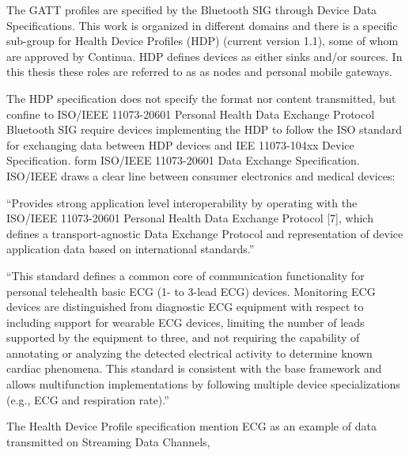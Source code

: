 The GATT profiles are specified by the Bluetooth SIG through Device Data Specifications. This work is organized in different domains and there is a specific sub-group for Health Device Profiles (HDP) (current version 1.1), some of whom are approved by Continua. HDP defines devices as either sinks and/or sources. In this thesis these roles are referred to as as nodes and personal mobile gateways.

The HDP specification does not specify the format nor content transmitted, but confine to ISO/IEEE 11073-20601 Personal Health Data Exchange Protocol \cite{newRef_18} Bluetooth SIG require devices implementing the HDP to follow the ISO standard for exchanging data between HDP devices and IEE 11073-104xx Device Specification. form ISO/IEEE 11073-20601 Data Exchange Specification. ISO/IEEE draws a clear line between consumer electronics and medical devices: 

``Provides strong application level interoperability by operating with the ISO/IEEE 11073-20601 Personal Health Data Exchange Protocol [7], which defines a transport-agnostic Data Exchange Protocol and representation of device application data based on international standards.''

``This standard defines a common core of communication functionality for personal telehealth basic ECG (1- to 3-lead ECG) devices. Monitoring ECG devices are distinguished from diagnostic ECG equipment with respect to including support for wearable ECG devices, limiting the number of leads supported by the equipment to three, and not requiring the capability of annotating or analyzing the detected electrical activity to determine known cardiac phenomena. This standard is consistent with the base framework and allows multifunction implementations by following multiple device specializations (e.g., ECG and respiration rate).'' \cite{newRef_18}

The Health Device Profile specification mention ECG as an example of data transmitted on Streaming Data Channels,



